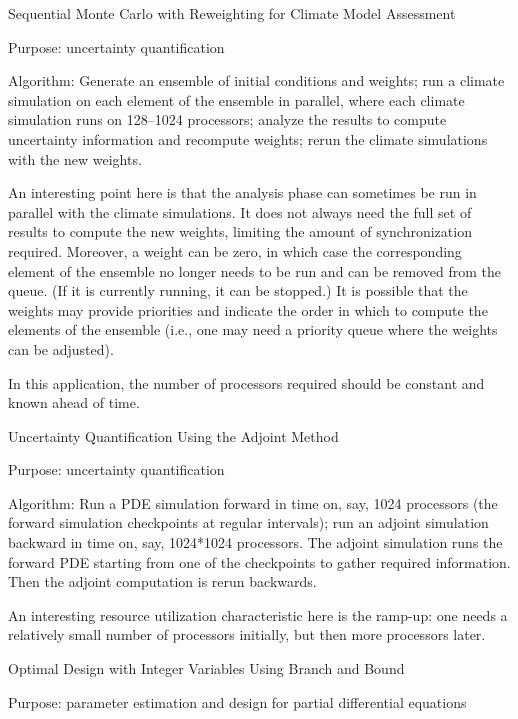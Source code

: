 \documentclass[10pt,letterpaper]{article}
\begin{document}
\begin{description}
\item Sequential Monte Carlo with Reweighting for Climate Model Assessment

Purpose: uncertainty quantification
 
 Algorithm:
      Generate an ensemble of initial conditions and weights;
      run a climate simulation on each element of the ensemble
         in parallel, where each climate simulation runs on 128--1024 processors;
      analyze the results to compute uncertainty information and recompute weights;
      rerun the climate simulations with the new weights.

An interesting point here is that the analysis phase can
sometimes be run in parallel with the climate simulations.  It does
not always need the full set of results to compute the new weights,
limiting the amount of synchronization required.  Moreover, a
weight can be zero, in which case the corresponding element of the ensemble
no longer needs to be run and can be removed from the queue.
(If it is currently running, it can be stopped.)  It is possible that
the weights may provide priorities
and indicate the order in which to compute the elements of the
ensemble (i.e., one may need a priority queue where the weights
can be adjusted).

In this application, the number of processors required should
be constant and known ahead of time.

\item Uncertainty Quantification Using the Adjoint Method

Purpose: uncertainty quantification

  Algorithm:
    Run a PDE simulation forward in time on, say, 1024 processors 
      (the forward simulation checkpoints at regular intervals);
    run an adjoint simulation backward in time on, say, 1024*1024
      processors.  The adjoint simulation runs the
      forward PDE starting from one of the checkpoints to gather
      required information. Then the adjoint computation
      is rerun backwards.

An interesting resource utilization characteristic here is the ramp-up: one needs a relatively
small number of processors initially, but then more processors later.

\item Optimal Design with Integer Variables Using Branch and Bound

  Purpose: parameter estimation and design for partial differential equations
  

\end{description}
\end{document}
